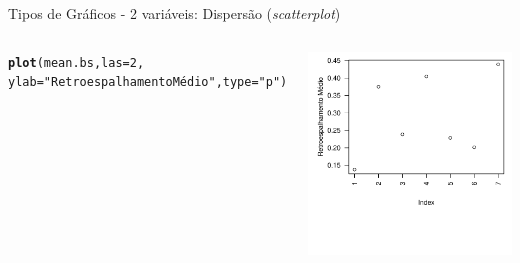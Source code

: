 \documentclass{beamer}\usepackage[]{graphicx}\usepackage[]{color}
\makeatletter
\newcommand{\hlnum}[1]{\textcolor[rgb]{0.686,0.059,0.569}{#1}}%
\newcommand{\hlstr}[1]{\textcolor[rgb]{0.192,0.494,0.8}{#1}}%
\newcommand{\hlstd}[1]{\textcolor[rgb]{0.345,0.345,0.345}{#1}}%
\newcommand{\hlkwc}[1]{\textcolor[rgb]{0.333,0.667,0.333}{#1}}%
\newcommand{\hlkwd}[1]{\textcolor[rgb]{0.737,0.353,0.396}{\textbf{#1}}}%
\newenvironment{kframe}{%
 \def\at@end@of@kframe{}%
 \ifinner\ifhmode%
  \def\at@end@of@kframe{\end{minipage}}%
  \begin{minipage}{\columnwidth}%
 \fi\fi%
 \def\FrameCommand##1{\hskip\@totalleftmargin \hskip-\fboxsep
 \colorbox{shadecolor}{##1}\hskip-\fboxsep
     \hskip-\linewidth \hskip-\@totalleftmargin \hskip\columnwidth}%
 \MakeFramed {\advance\hsize-\width
   \@totalleftmargin\z@ \linewidth\hsize
   \@setminipage}}%
 {\par\unskip\endMakeFramed%
 \at@end@of@kframe}
\newenvironment{knitrout}{}{} %
\renewenvironment{knitrout}{\setlength{\topsep}{0mm}}{}
\makeatother
\begin{document}
\begin{frame}[fragile]{Tipos de Gráficos - 2 variáveis: Dispersão (\emph{scatterplot})}

\begin{columns}[t]


\begin{knitrout}\tiny
{}\color{fgcolor}\begin{kframe}
\begin{alltt}
\hlkwd{plot}\hlstd{(mean.bs,}\hlkwc{las}\hlstd{=}\hlnum{2}\hlstd{,}
     \hlkwc{ylab}\hlstd{=}\hlstr{"Retroespalhamento Médio"}\hlstd{,}\hlkwc{type}\hlstd{=}\hlstr{"p"}\hlstd{)}
\end{alltt}
\end{kframe}
\end{knitrout}


\begin{knitrout}
\color{fgcolor}
\includegraphics[width=1\linewidth]{figure/unnamed-chunk-57-1} 

\end{knitrout}

\end{columns}

\end{frame}
\end{document}
